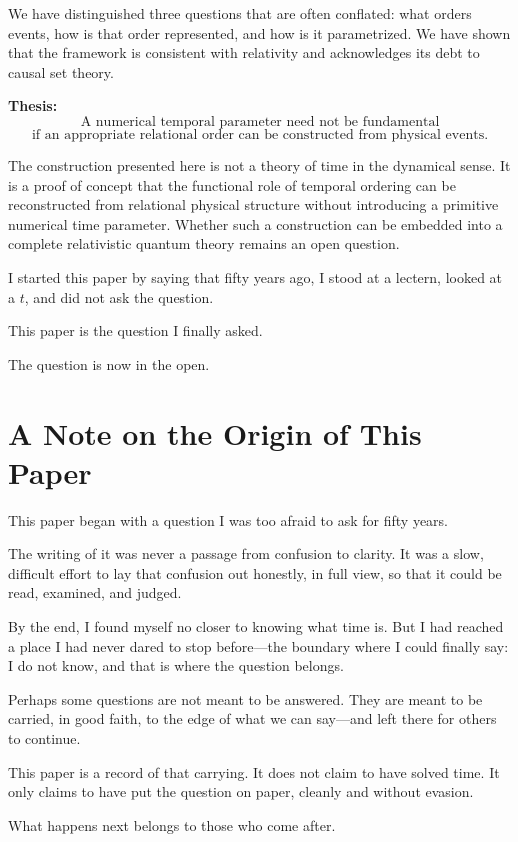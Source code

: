 \documentclass[12pt, a4paper]{article}
\begin{document}
We have distinguished three questions that are often conflated: what orders events, how is that order represented, and how is it parametrized. We have shown that the framework is consistent with relativity and acknowledges its debt to causal set theory.

\textbf{Thesis:}
\[
\boxed{\text{A numerical temporal parameter need not be fundamental}}
\]
\[
\boxed{\text{if an appropriate relational order can be constructed from physical events.}}
\]

The construction presented here is not a theory of time in the dynamical sense. It is a proof of concept that the functional role of temporal ordering can be reconstructed from relational physical structure without introducing a primitive numerical time parameter. Whether such a construction can be embedded into a complete relativistic quantum theory remains an open question.

I started this paper by saying that fifty years ago, I stood at a lectern, looked at a \( t \), and did not ask the question.

This paper is the question I finally asked.

The question is now in the open.

\section*{A Note on the Origin of This Paper}

This paper began with a question I was too afraid to ask for fifty years.

The writing of it was never a passage from confusion to clarity. It was a slow, difficult effort to lay that confusion out honestly, in full view, so that it could be read, examined, and judged.

By the end, I found myself no closer to knowing what time is. But I had reached a place I had never dared to stop before---the boundary where I could finally say: I do not know, and that is where the question belongs.

Perhaps some questions are not meant to be answered. They are meant to be carried, in good faith, to the edge of what we can say---and left there for others to continue.

This paper is a record of that carrying. It does not claim to have solved time. It only claims to have put the question on paper, cleanly and without evasion.

What happens next belongs to those who come after.
\end{document}
